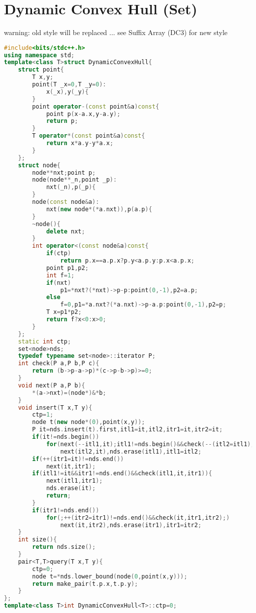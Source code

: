 \documentclass{book}
\begin{document}
\section{Dynamic Convex Hull (Set)}
warning: old style will be replaced ... see Suffix Array (DC3) for new style\begin{lstlisting}[language=C++,title={Dynamic Convex Hull (Set).hpp (2239 bytes, 77 lines)}]
#include<bits/stdc++.h>
using namespace std;
template<class T>struct DynamicConvexHull{
    struct point{
        T x,y;
        point(T _x=0,T _y=0):
            x(_x),y(_y){
        }
        point operator-(const point&a)const{
            point p(x-a.x,y-a.y);
            return p;
        }
        T operator*(const point&a)const{
            return x*a.y-y*a.x;
        }
    };
    struct node{
        node**nxt;point p;
        node(node**_n,point _p):
            nxt(_n),p(_p){
        }
        node(const node&a):
            nxt(new node*(*a.nxt)),p(a.p){
        }
        ~node(){
            delete nxt;
        }
        int operator<(const node&a)const{
            if(ctp)
                return p.x==a.p.x?p.y<a.p.y:p.x<a.p.x;
            point p1,p2;
            int f=1;
            if(nxt)
                p1=*nxt?(*nxt)->p-p:point(0,-1),p2=a.p;
            else
                f=0,p1=*a.nxt?(*a.nxt)->p-a.p:point(0,-1),p2=p;
            T x=p1*p2;
            return f?x<0:x>0;
        }
    };
    static int ctp;
    set<node>nds;
    typedef typename set<node>::iterator P;
    int check(P a,P b,P c){
        return (b->p-a->p)*(c->p-b->p)>=0;
    }
    void next(P a,P b){
        *(a->nxt)=(node*)&*b;
    }
    void insert(T x,T y){
        ctp=1;
        node t(new node*(0),point(x,y));
        P it=nds.insert(t).first,itl1=it,itl2,itr1=it,itr2=it;
        if(it!=nds.begin())
            for(next(--itl1,it);itl1!=nds.begin()&&check(--(itl2=itl1),itl1,it);)
                next(itl2,it),nds.erase(itl1),itl1=itl2;
        if(++(itr1=it)!=nds.end())
            next(it,itr1);
        if(itl1!=it&&itr1!=nds.end()&&check(itl1,it,itr1)){
            next(itl1,itr1);
            nds.erase(it);
            return;
        }
        if(itr1!=nds.end())
            for(;++(itr2=itr1)!=nds.end()&&check(it,itr1,itr2);)
                next(it,itr2),nds.erase(itr1),itr1=itr2;
    }
    int size(){
        return nds.size();
    }
    pair<T,T>query(T x,T y){
        ctp=0;
        node t=*nds.lower_bound(node(0,point(x,y)));
        return make_pair(t.p.x,t.p.y);
    }
};
template<class T>int DynamicConvexHull<T>::ctp=0;
\end{lstlisting}
\end{document}
